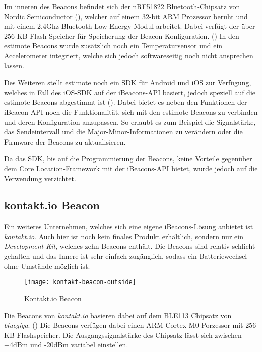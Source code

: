 Im inneren des Beacons befindet sich der nRF51822 Bluetooth-Chipsatz von Nordic Semiconductor (\citet{nordicchipset}), welcher auf einem 32-bit ARM Prozessor beruht und mit einem 2,4Ghz Bluetooth Low Energy Modul arbeitet. Dabei verfügt der über 256 KB Flash-Speicher für Speicherung der Beacon-Konfiguration. (\citet{estimotespecs}) 
In den estimote Beacons wurde zusätzlich noch ein Temperatursensor und ein Accelerometer integriert, welche sich jedoch softwareseitig noch nicht ansprechen lassen.

Des Weiteren stellt estimote noch ein SDK für Android und iOS zur Verfügung, welches in Fall des iOS-SDK auf der iBeacons-API basiert, jedoch speziell auf die estimote-Beacons abgestimmt ist (\citet{estimoteapi}). 
Dabei bietet es neben den Funktionen der iBeacon-API noch die Funktionalität, sich mit den estimote Beacons zu verbinden und deren Konfiguration anzupassen. So erlaubt es zum Beispiel die Signalstärke, das Sendeintervall und die Major-Minor-Informationen zu verändern oder die Firmware der Beacons zu aktualisieren.

Da das SDK, bis auf die Programmierung der Beacons, keine Vorteile gegenüber dem Core Location-Framework mit der iBeacons-API bietet, wurde jedoch auf die Verwendung verzichtet.

\subsection{kontakt.io Beacon}
\label{sec:dataandmeasurement:mobilebeacon:kontaktio}
Ein weiteres Unternehmen, welches sich eine eigene iBeacons-Lösung anbietet ist \emph{kontakt.io}. Auch hier ist noch kein finales Produkt erhältlich, sondern nur ein \emph{Development Kit}, welches zehn Beacons enthält. 
Die Beacons sind relativ schlicht gehalten und das Innere ist sehr einfach zugänglich, sodass ein Batteriewechsel ohne Umstände möglich ist.


\begin{figure}[htb!]
		\centering
	\texttt{[image: kontakt-beacon-outside]}
	\caption{Kontakt.io Beacon}
	\label{kontakt-beacon-outside}
\end{figure}

Die Beacons von \emph{kontakt.io} basieren dabei auf dem BLE113 Chipsatz von \emph{bluegiga}. (\citet{bluegigachipset}) Die Beacons verfügen dabei einen ARM Cortex M0 Porzessor mit 256 KB Flashspeicher. Die Ausgangssignalstärke des Chipsatz lässt sich zwischen +4dBm und -20dBm variabel einstellen.


